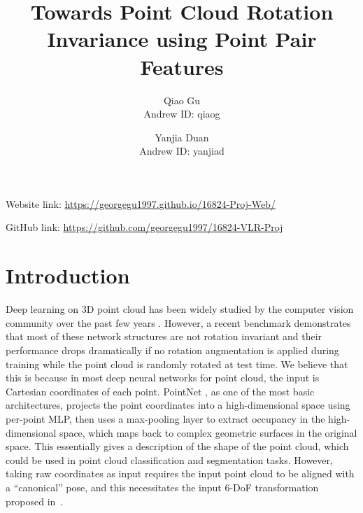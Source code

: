 \documentclass{article}
\title{Towards Point Cloud Rotation Invariance using Point Pair Features}
\author{Qiao Gu \\
  Andrew ID: qiaog
  \and
  Yanjia Duan \\
  Andrew ID: yanjiad
  }
\date{}
\begin{document}
\maketitle

Website link: \href{https://georgegu1997.github.io/16824-Proj-Web/}{https://georgegu1997.github.io/16824-Proj-Web/}

GitHub link: \href{https://github.com/georgegu1997/16824-VLR-Proj}{https://github.com/georgegu1997/16824-VLR-Proj}

\section{Introduction}

Deep learning on 3D point cloud has been widely studied by the computer vision community over the past few years \cite{Qi2017pointnet, qi2017pointnet2, Wang2019-dgcnn, Li2018-PointCNN}. 
However, a recent benchmark \cite{taghanaki2020robustpointset} demonstrates that most of these network structures are not rotation invariant and their performance drops dramatically if no rotation augmentation is applied during training while the point cloud is randomly rotated at test time. 
We believe that this is because in most deep neural networks for point cloud, the input is Cartesian coordinates of each point. PointNet \cite{Qi2017pointnet}, as one of the most basic architectures, projects the point coordinates into a high-dimensional space using per-point MLP, then uses a max-pooling layer to extract occupancy in the high-dimensional space, which maps back to complex geometric surfaces in the original space. This essentially gives a description of the shape of the point cloud, which could be used in point cloud classification and segmentation tasks.
However, taking raw coordinates as input requires the input point cloud to be aligned with a ``canonical'' pose, and this necessitates the input 6-DoF transformation proposed in~\cite{Qi2017pointnet}. 
\end{document}
